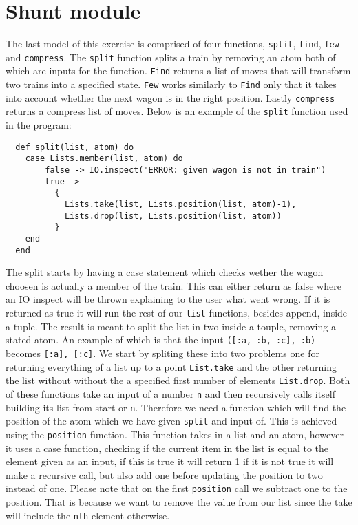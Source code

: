 \documentclass[a4paper,11pt]{article}
\begin{document}
\section*{Shunt module}

The last model of this exercise is comprised of four functions, {\tt split}, {\tt find}, {\tt few} and {\tt compress}. The {\tt split} function splits a train by removing an atom both of which are inputs for the function. {\tt Find} returns a list of moves that will transform two trains into a specified state. {\tt Few} works similarly to {\tt Find} only that it takes into account whether the next wagon is in the right position. Lastly {\tt compress} returns a compress list of moves. Below is an example of the {\tt split} function used in the program:

\begin{verbatim}
  def split(list, atom) do
    case Lists.member(list, atom) do
        false -> IO.inspect("ERROR: given wagon is not in train")
        true -> 
          {
            Lists.take(list, Lists.position(list, atom)-1),
            Lists.drop(list, Lists.position(list, atom))
          }
    end
  end
\end{verbatim}

The split starts by having a case statement which checks wether the wagon choosen is actually a member of the train. This can either return as false where an IO inspect will be thrown explaining to the user what went wrong. If it is returned as true it will run the rest of our {\tt list} functions, besides append, inside a tuple. The result is meant to split the list in two inside a touple, removing a stated atom. An example of which is that the input {\tt ([:a, :b, :c], :b)} becomes {\tt {[:a], [:c]}}. We start by spliting these into two problems one for returning everything of a list up to a point {\tt List.take} and the other returning the list without without the a specified first number of elements {\tt List.drop}. Both of these functions take an input of a number {\tt n} and then recursively calls itself building its list from start or {\tt n}. Therefore we need a function which will find the position of the atom which we have given {\tt split} and input of. This is achieved using the {\tt position} function. This function takes in a list and an atom, however it uses a case function, checking if the current item in the list is equal to the element given as an input, if this is true it will return 1 if it is not true it will make a recursive call, but also add one before updating the position to two instead of one. Please note that on the first {\tt position} call we subtract one to the position. That is because we want to remove the value from our list since the take will include the {\tt nth} element otherwise. 
\end{document}
